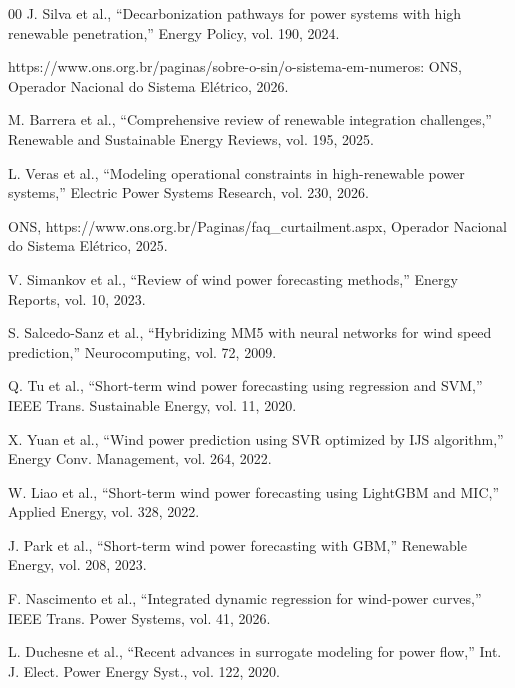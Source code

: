 \documentclass[conference]{IEEEtran}
\begin{document}


\begin{thebibliography}{00}
 J. Silva et al., ``Decarbonization pathways for power systems with high renewable penetration,'' Energy Policy, vol. 190, 2024.

 https://www.ons.org.br/paginas/sobre-o-sin/o-sistema-em-numeros: ONS,  Operador Nacional do Sistema Elétrico, 2026.

 M. Barrera et al., ``Comprehensive review of renewable integration challenges,'' Renewable and Sustainable Energy Reviews, vol. 195, 2025.

 L. Veras et al., ``Modeling operational constraints in high-renewable power systems,'' Electric Power Systems Research, vol. 230, 2026.

 ONS, {https://www.ons.org.br/Paginas/faq_curtailment.aspx},  Operador Nacional do Sistema Elétrico, 2025.

 V. Simankov et al., ``Review of wind power forecasting methods,'' Energy Reports, vol. 10, 2023.

 S. Salcedo-Sanz et al., ``Hybridizing MM5 with neural networks for wind speed prediction,'' Neurocomputing, vol. 72, 2009.

 Q. Tu et al., ``Short-term wind power forecasting using regression and SVM,'' IEEE Trans. Sustainable Energy, vol. 11, 2020.

 X. Yuan et al., ``Wind power prediction using SVR optimized by IJS algorithm,'' Energy Conv. Management, vol. 264, 2022.

 W. Liao et al., ``Short-term wind power forecasting using LightGBM and MIC,'' Applied Energy, vol. 328, 2022.

 J. Park et al., ``Short-term wind power forecasting with GBM,'' Renewable Energy, vol. 208, 2023.

 F. Nascimento et al., ``Integrated dynamic regression for wind-power curves,'' IEEE Trans. Power Systems, vol. 41, 2026.

 L. Duchesne et al., ``Recent advances in surrogate modeling for power flow,'' Int. J. Elect. Power Energy Syst., vol. 122, 2020.


\end{thebibliography}
\end{document}
